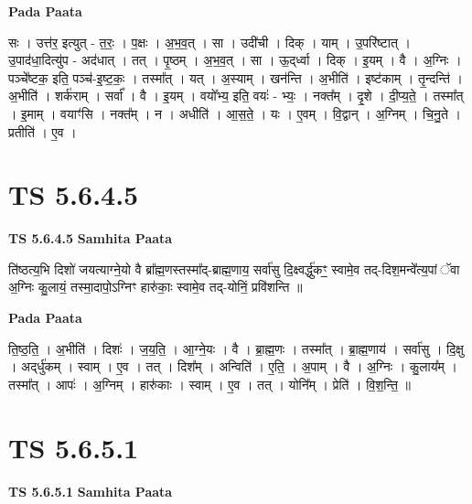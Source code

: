 \documentclass[17pt]{extarticle}
\begin{document}
\textbf{Pada Paata} \newline

सः । उत्त॑र॒ इत्युत् - त॒रः॒ । प॒क्षः । अ॒भ॒व॒त् । सा । उदी॑ची । दिक् । याम् । उ॒परि॑ष्टात् । उ॒पाद॑धा॒दित्यु॑प - अद॑धात् । तत् । पृ॒ष्ठम् । अ॒भ॒व॒त् । सा । ऊ॒द्‌र्ध्वा । दिक् । इ॒यम् । वै । अ॒ग्निः । पञ्चे᳚ष्टक॒ इति॒ पञ्च॑-इ॒ष्ट॒कः॒ । तस्मा᳚त् । यत् । अ॒स्याम् । खन॑न्ति । अ॒भीति॑ । इष्ट॑काम् । तृ॒न्दन्ति॑ । अ॒भीति॑ । शर्क॑राम् । सर्वा᳚ । वै । इ॒यम् । वयो᳚भ्य॒ इति॒ वयः॑ - भ्यः॒ । नक्त᳚म् । दृ॒शे । दी॒प्य॒ते॒ । तस्मा᳚त् । इ॒माम् । वयाꣳ॑सि । नक्त᳚म् । न । अधीति॑ । आ॒स॒ते॒ । यः । ए॒वम् । वि॒द्वान् । अ॒ग्निम् । चि॒नु॒ते । प्रतीति॑ । ए॒व ।  \newline




\section*{ TS 5.6.4.5 }

\textbf{TS 5.6.4.5 } \newline
\textbf{Samhita Paata} \newline

ति॑ष्ठत्य॒भि दिशो॑ जयत्याग्ने॒यो वै ब्रा᳚ह्म॒णस्तस्मा᳚द्-ब्राह्म॒णाय॒ सर्वा॑सु दि॒क्ष्वर्द्धु॑कꣳ॒॒ स्वामे॒व तद्-दिश॒मन्वे᳚त्य॒पां ॅवा अ॒ग्निः कु॒लायं॒ तस्मा॒दापो॒ऽग्निꣳ हारु॑काः॒ स्वामे॒व तद्-योनिं॒ प्रवि॑शन्ति ॥ \newline

\textbf{Pada Paata} \newline

ति॒ष्ठ॒ति॒ । अ॒भीति॑ । दिशः॑ । ज॒य॒ति॒ । आ॒ग्ने॒यः । वै । ब्रा॒ह्म॒णः । तस्मा᳚त् । ब्रा॒ह्म॒णाय॑ । सर्वा॑सु । दि॒क्षु । अद्‌र्धु॑कम् । स्वाम् । ए॒व । तत् । दिश᳚म् । अन्विति॑ । ए॒ति॒ । अ॒पाम् । वै । अ॒ग्निः । कु॒लाय᳚म् । तस्मा᳚त् । आपः॑ । अ॒ग्निम् । हारु॑काः । स्वाम् । ए॒व । तत् । योनि᳚म् । प्रेति॑ । वि॒श॒न्ति॒ ॥  \newline




\section*{ TS 5.6.5.1 }

\textbf{TS 5.6.5.1 } \newline
\textbf{Samhita Paata} \newline
\end{document}
